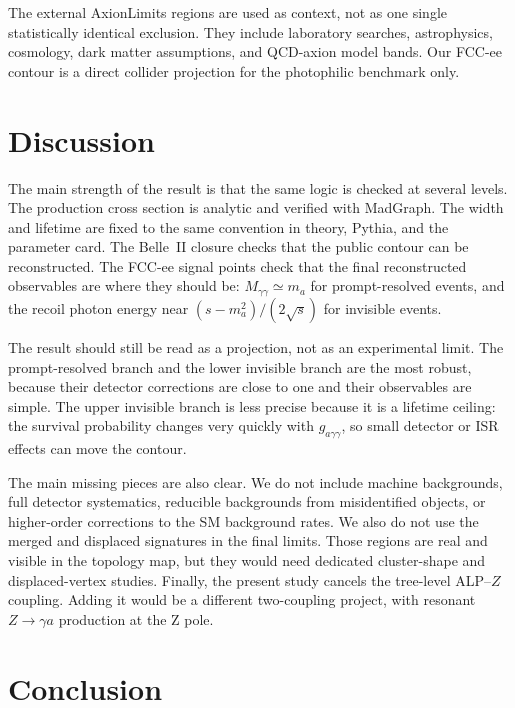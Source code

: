 \documentclass[12pt,a4paper]{article}
\begin{document}
The external AxionLimits regions are used as context, not as one single
statistically identical exclusion. They include laboratory searches,
astrophysics, cosmology, dark matter assumptions, and QCD-axion model bands.
Our FCC-ee contour is a direct collider projection for the photophilic
benchmark only.

\section{Discussion}
\label{sec:discussion}

The main strength of the result is that the same logic is checked at several
levels. The production cross section is analytic and verified with MadGraph.
The width and lifetime are fixed to the same convention in theory, Pythia, and
the parameter card. The Belle~II closure checks that the public contour can be
reconstructed. The FCC-ee signal points check that the final reconstructed
observables are where they should be: $M_{\gamma\gamma}\simeq m_{a}$ for
prompt-resolved events, and the recoil photon energy near
$(s-m_{a}^2)/(2\sqrt{s})$ for invisible events.

The result should still be read as a projection, not as an experimental limit.
The prompt-resolved branch and the lower invisible branch are the most robust,
because their detector corrections are close to one and their observables are
simple. The upper invisible branch is less precise because it is a lifetime
ceiling: the survival probability changes very quickly with
$g_{a\gamma\gamma}$, so small detector or ISR effects can move the contour.

The main missing pieces are also clear. We do not include machine backgrounds,
full detector systematics, reducible backgrounds from misidentified objects, or
higher-order corrections to the SM background rates. We also do not use the
merged and displaced signatures in the final limits. Those regions are real and
visible in the topology map, but they would need dedicated cluster-shape and
displaced-vertex studies. Finally, the present study cancels the tree-level
ALP--$Z$ coupling. Adding it would be a different two-coupling project, with
resonant $Z\to\gamma a$ production at the Z pole.

\section{Conclusion}
\label{sec:conclusion}
\end{document}
